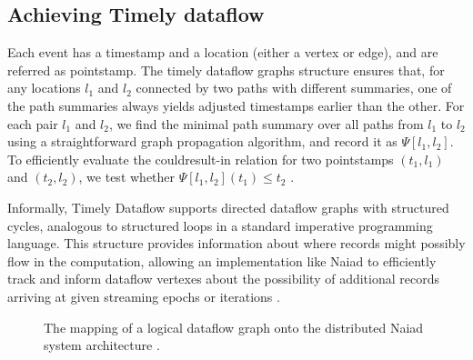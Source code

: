 \documentclass[9pt,twocolumn,twoside]{../../styles/osajnl}
\begin{document}
\subsection{Achieving Timely dataflow}
Each event has a timestamp and a location (either a vertex or edge),
and are referred as pointstamp. The timely dataflow graphs structure
ensures that, for any locations $l_1$ and $l_2$ connected by two paths
with different summaries, one of the path summaries always yields
adjusted timestamps earlier than the other. For each pair $l_1$ and
$l_2$, we find the minimal path summary over all paths from $l_1$ to
$l_2$ using a straightforward graph propagation algorithm, and record
it as $\Psi[l_1, l_2]$. To efficiently evaluate the couldresult-in
relation for two pointstamps $(t_1, l_1)$ and $(t_2, l_2)$, we test
whether $\Psi[l_1, l_2](t_1) \le t_2$ \cite{paper1-Naiad}.

Informally, Timely Dataflow supports directed dataflow graphs with
structured cycles, analogous to structured loops in a standard
imperative programming language. This structure provides information
about where records might possibly flow in the computation, allowing
an implementation like Naiad to efficiently track and inform dataflow
vertexes about the possibility of additional records arriving at given
streaming epochs or iterations \cite{www-naiad}.

\begin{figure}[htbp]
\centering
{}
\caption{The mapping of a logical dataflow graph onto the distributed
  Naiad system architecture \cite{paper1-Naiad}.}
\label{Naiad-LDF}
\end{figure}
\end{document}
